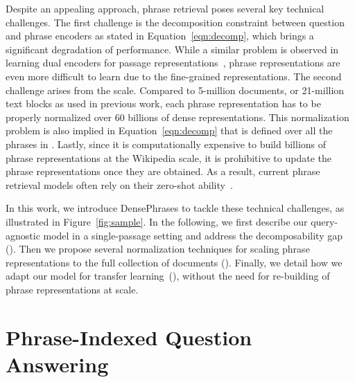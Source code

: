 \documentclass[11pt,a4paper]{article}
\newcommand{\ours}{DensePhrases}
\begin{document}
Despite an appealing approach, phrase retrieval poses several key technical challenges.
The first challenge is the decomposition constraint between question and phrase encoders as stated in Equation~\eqref{eqn:decomp}, which brings a significant degradation of performance.
While a similar problem is observed in learning dual encoders for passage representations~\citep{humeau2019poly,khattab2020colbert}, phrase representations are even more difficult to learn due to the fine-grained representations.
The second challenge arises from the scale.
Compared to 5-million documents, or 21-million text blocks as used in previous work, each phrase representation has to be properly normalized over 60 billions of dense representations.
This normalization problem is also implied in Equation~\eqref{eqn:decomp} that  is defined over all the phrases in .
Lastly, since it is computationally expensive to build billions of phrase representations at the Wikipedia scale, it is prohibitive to update the phrase representations once they are obtained.
As a result, current phrase retrieval models often rely on their zero-shot ability~\citep{lee2020contextualized}. 

























In this work, we introduce {\ours} to tackle these technical challenges, as illustrated in Figure~\ref{fig:sample}. In the following, we first describe our query-agnostic model in a single-passage setting and address the decomposability gap (). Then we propose several normalization techniques for scaling phrase representations to the full collection of documents  ().
Finally, we detail how we adapt our model for transfer learning~(), without the need for re-building of phrase representations at scale.
 

\section{Phrase-Indexed Question Answering}\vspace{-0.1cm}
\label{sec:piqa}
\end{document}
